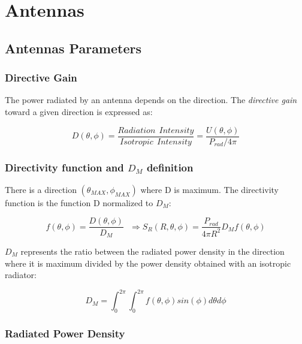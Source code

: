 \chapter{Antennas} %
\label{cha:antennas}

\section{Antennas Parameters} %
\label{sec:antennas_parameters}

\subsection{Directive Gain} %
\label{sub:directive_gain}

The power radiated by an antenna depends on the direction. The \textit{directive gain} toward a given direction is expressed as:

\begin{equation}
	D ( \theta, \phi) = \frac {Radiation \ \ Intensity} {Isotropic \ \ Intensity } = 	    \frac{ U(\theta , \phi)} {P_{rad}/ 4\pi}
\end{equation}


\subsection{Directivity function and $D_M$ definition} %
\label{sub:_d_m_}

There is a direction $(\theta_{MAX},\phi_{MAX})$ where D is maximum. The directivity function is the function D normalized to $D_M$:

\begin{equation}
	f(\theta,\phi)=\frac{ \textit{D}(\theta,\phi)}{D_M} \ \ \ \Longrightarrow S_R(R,\theta,\phi)= \frac{P_{rad}}{4\pi R^2} D_M f(\theta,\phi)
\end{equation}

$D_M$ represents the ratio between the radiated power density in the direction where it is maximum divided by the power density obtained with an isotropic radiator:

\begin{equation}
	D_M= \int_0^{2\pi}\int_0^{2\pi} f(\theta,\phi)sin(\phi) d\theta d\phi
\end{equation}


\subsection{Radiated Power Density} %
\label{sub:radiated_power_density}

